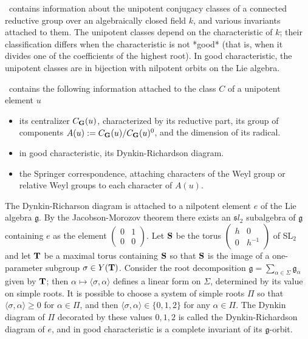 \def\gg{{\mathfrak g}}
\def\Sym{{\mathfrak S}}
\def\gsl{{\mathfrak sl}}
\def\cB{{\mathcal B}}
\def\bG{{\bf G}}
\def\bS{{\bf S}}
\def\bT{{\bf T}}

\CHEVIE\  contains information about  the unipotent conjugacy  classes of a
connected  reductive  group  over  an  algebraically  closed field $k$, and
various  invariants attached to  them. The unipotent  classes depend on the
characteristic of $k$; their classification differs when the characteristic
is  not *good*  (that is,  when it  divides one  of the coefficients of the
highest  root).  In  good  characteristic,  the  unipotent  classes  are in
bijection with nilpotent orbits on the Lie algebra.

\CHEVIE\  contains the following information attached to the class $C$ of a
unipotent element $u$\:
\begin{itemize}
\item  its centralizer $C_\bG(u)$, characterized by its reductive part, its
group  of components $A(u):=C_\bG(u)/C_\bG(u)^0$, and  the dimension of its
radical.
\item in good characteristic, its  Dynkin-Richardson  diagram.
\item  the Springer correspondence, attaching  characters of the Weyl group
or relative Weyl groups to each character of $A(u)$.
\end{itemize}

The  Dynkin-Richarson diagram is attached to a nilpotent element $e$ of the
Lie algebra $\gg$. By the Jacobson-Morozov theorem there exists an $\gsl_2$
subalgebra of $\gg$ containing $e$ as the element
$\left(\begin{array}{cc}0&1\\0&0\end{array}\right)$. Let $\bS$ be the torus
$\left(\begin{array}{cc}h&0\\0&h^{-1}\end{array}\right)$  of SL$_2$ and let
$\bT$  be a maximal torus containing $\bS$ so  that $\bS$ is the image of a
one-parameter  subgroup $\sigma\in Y(\bT)$. Consider the root decomposition
$\gg=\sum_{\alpha\in\Sigma}\gg_\alpha$ given by $\bT$; then
$\alpha\mapsto\langle\sigma,\alpha\rangle$   defines   a   linear  form  on
$\Sigma$, determined by its value on simple roots. It is possible to choose
a  system of simple roots  $\Pi$ so that $\langle\sigma,\alpha\rangle\ge 0$
for  $\alpha\in\Pi$, and then $\langle\sigma,\alpha\rangle\in\{0,1,2\}$ for
any  $\alpha\in\Pi$. The Dynkin diagram of  $\Pi$ decorated by these values
$0,1,2$  is  called  the  Dynkin-Richardson  diagram  of  $e$,  and in good
characteristic is a complete invariant of its $\gg$-orbit.

